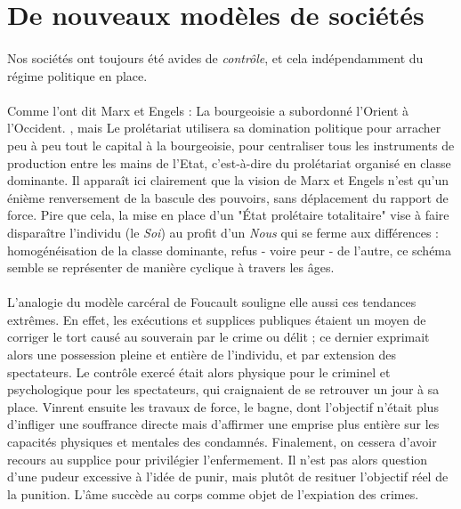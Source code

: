 \section{De nouveaux modèles de sociétés}

\paragraph{} Nos sociétés ont toujours été avides de \emph{contrôle}, et cela indépendamment du régime politique en 
place. 

\paragraph{} Comme l'ont dit Marx et Engels : \guillemotleft La bourgeoisie a subordonné l'Orient à l'Occident. \guillemotright,
mais \guillemotleft Le prolétariat utilisera sa domination politique pour arracher peu à peu tout le capital à la
bourgeoisie, pour centraliser tous les instruments de production entre les mains de l'Etat, c'est-à-dire du prolétariat
organisé en classe dominante.\guillemotright \cite{Marx1} Il apparaît ici clairement que la vision de Marx et Engels
n'est qu'un énième renversement de la bascule des pouvoirs, sans déplacement du rapport de force. Pire que cela, la mise
en place d'un "État prolétaire totalitaire" vise à faire disparaître l'individu (le \emph{Soi}) au profit d'un \emph{Nous}
qui se ferme aux différences : homogénéisation de la classe dominante, refus - voire peur - de l'autre, ce schéma semble
se représenter de manière cyclique à travers les âges.

\paragraph{} L'analogie du modèle carcéral de Foucault souligne elle aussi ces tendances extrêmes.
En effet, les exécutions et supplices publiques étaient un moyen de corriger le tort causé au souverain par le crime ou
délit ; ce dernier exprimait alors une possession pleine et entière de l'individu, et par extension des spectateurs. 
Le contrôle exercé était alors physique pour le criminel et psychologique pour les spectateurs, qui craignaient de se
retrouver un jour à sa place. Vinrent ensuite les travaux de force, le bagne, dont l'objectif n'était plus d'infliger
une souffrance directe mais d'affirmer une emprise plus entière sur les capacités physiques et mentales des condamnés.
Finalement, on cessera d'avoir recours au supplice pour privilégier l'enfermement. Il n'est pas alors question d'une
pudeur excessive à l'idée de punir, mais plutôt de resituer l'objectif réel de la punition.
 \guillemotleft L'âme succède au corps comme objet de l'expiation des crimes. \guillemotright \cite{Foucault0}

